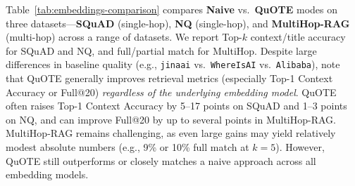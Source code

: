 Table~\ref{tab:embeddings-comparison} compares \textbf{Naive} vs.\ \textbf{QuOTE} 
 modes on three datasets---\textbf{SQuAD} (single-hop), \textbf{NQ} (single-hop), 
and \textbf{MultiHop-RAG} (multi-hop) across a range of datasets. We report Top-$k$ context/title accuracy for SQuAD and NQ, 
and full/partial match for MultiHop. Despite large differences in baseline quality
(e.g., \texttt{jinaai} vs.\ \texttt{WhereIsAI} vs.\ \texttt{Alibaba}),
note that QuOTE generally improves 
retrieval metrics (especially Top-1 Context Accuracy or Full@20) \emph{regardless of the underlying embedding model}.
QuOTE often raises Top-1 Context Accuracy by 5--17 points on SQuAD and 1--3 points on NQ, and can improve Full@20 by up to several points in MultiHop-RAG.
MultiHop-RAG remains challenging, as even large gains may yield relatively modest absolute numbers (e.g., 9\% or 10\% full match at \(k=5\)). However, QuOTE still outperforms or closely matches a naive approach across all embedding models.


